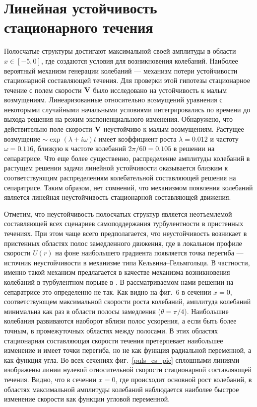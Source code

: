 \section{Линейная устойчивость стационарного течения}

Полосчатые структуры достигают максимальной своей амплитуды в области $x\in[-5,0]$, где создаются условия для возникновения колебаний. Наиболее вероятный механизм генерации колебаний --- механизм потери устойчивости стационарной составляющей течения. Для проверки этой гипотезы стационарное течение с полем скорости $\mathbf{V}$ было исследовано на устойчивость к малым возмущениям. Линеаризованные относительно возмущений уравнения с некоторыми случайными начальными условиями интегрировались по времени до выхода решения на режим экспоненциального изменения. Обнаружено, что действительно поле скорости $\mathbf{V}$ неустойчиво к малым возмущениям. Растущее возмущение $\sim\exp(\lambda+i\omega)t$ имеет коэффициент роста $\lambda=0.012$ и частоту $\omega=0.116$, близкую к частоте колебаний $2\pi/60=0.105$ в решении на сепаратрисе. Что еще более существенно, распределение амплитуды колебаний в растущем решении задачи линейной устойчивости оказывается близким к соответствующим распределениям колебательной составляющей решения на сепаратрисе. Таким образом, нет сомнений, что механизмом появления колебаний является линейная неустойчивость стационарной составляющей движения.

Отметим, что неустойчивость полосчатых структур является неотъемлемой составляющей всех сценариев самоподдержания турбулентности в пристенных течениях. При этом чаще всего предполагается, что неустойчивость возникает в пристенных областях полос замедленного движения, где в локальном профиле скорости $U(r)$ на фоне наибольшего градиента появляется точка перегиба --- источник неустойчивости в механизме типа Кельвина--Гельмгольца. В частности, именно такой механизм предлагается в качестве механизма возникновения колебаний в турбулентном порыве в \cite{Shumizu2009}. В рассматриваемом нами решении на сепаратрисе это определенно не так. Как видно на фиг.~6 в сечении $x=0$, соответствующем максимальной скорости роста колебаний, амплитуда колебаний минимальна как раз в области полосы замедления ($\theta=\pi/4$). Наибольшие колебания развиваются наоборот вблизи полос ускорения, а если быть более точным, в промежуточных областях между полосами. В этих областях стационарная составляющая скорости течения претерпевает наибольшее изменение и имеет точки перегиба, но не как функция радиальной переменной, а как функция угла. Во всех сечениях фиг.~\ref{puls_cs_pic} сплошными линиями изображены линии нулевой относительной скорости стационарной составляющей течения. Видно, что в сечении $x=0$, где происходит основной рост колебаний, в областях максимальной амплитуды колебаний наблюдается наиболее быстрое изменение скорости как функции угловой переменной.

